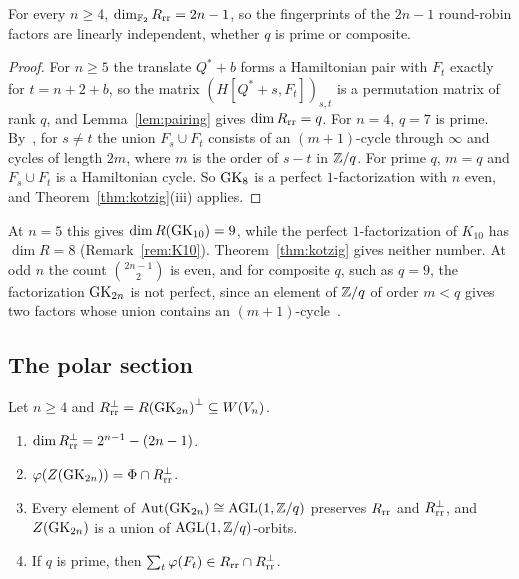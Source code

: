 \begin{theorem}\label{thm:rr}
For every $n\ge4$, $\dim_{\mathbb{F}_2}R_{\mathrm{rr}}=2n-1$, so the fingerprints of the $2n-1$ round-robin factors are linearly independent, whether $q$ is prime or composite.
\end{theorem}

\begin{proof}
For $n\ge5$ the translate $Q^*+b$ forms a Hamiltonian pair with $F_t$ exactly for $t=n+2+b$, so the matrix ${(H[Q^*+s,F_t])}_{s,t}$ is a permutation matrix of rank $q$, and Lemma~\ref{lem:pairing} gives $\dim R_{\mathrm{rr}}=q$. For $n=4$, $q=7$ is prime. By~\cite[Thm.~2.1]{Cameron75}, for $s\ne t$ the union $F_s\cup F_t$ consists of an $(m+1)$-cycle through $\infty$ and cycles of length $2m$, where $m$ is the order of $s-t$ in $\mathbb{Z}/q$. For prime $q$, $m=q$ and $F_s\cup F_t$ is a Hamiltonian cycle. So $\mathrm{GK}_8$ is a perfect $1$-factorization with $n$ even, and Theorem~\ref{thm:kotzig}(iii) applies.
\end{proof}

At $n=5$ this gives $\dim R(\mathrm{GK}_{10})=9$, while the perfect $1$-factorization of $K_{10}$ has $\dim R=8$ (Remark~\ref{rem:K10}). Theorem~\ref{thm:kotzig} gives neither number. At odd $n$ the count $\binom{2n-1}{2}$ is even, and for composite $q$, such as $q=9$, the factorization $\mathrm{GK}_{2n}$ is not perfect, since an element of $\mathbb{Z}/q$ of order $m<q$ gives two factors whose union contains an $(m+1)$-cycle~\cite[Thm.~2.1]{Cameron75}.

\subsection{The polar section}\label{subsec:slice}

\begin{theorem}\label{thm:slice}
Let $n\ge4$ and $R_{\mathrm{rr}}^\perp={R(\mathrm{GK}_{2n})}^\perp\subseteq W(V_n)$.
\begin{enumerate}
\item $\dim R_{\mathrm{rr}}^\perp=2^{n-1}-(2n-1)$.
\item $\varphi(Z(\mathrm{GK}_{2n}))=\Phi\cap R_{\mathrm{rr}}^\perp$.
\item Every element of $\operatorname{Aut}(\mathrm{GK}_{2n})\cong\operatorname{AGL}(1,\mathbb{Z}/q)$ preserves $R_{\mathrm{rr}}$ and $R_{\mathrm{rr}}^\perp$, and $Z(\mathrm{GK}_{2n})$ is a union of $\operatorname{AGL}(1,\mathbb{Z}/q)$-orbits.
\item If $q$ is prime, then $\sum_t\varphi(F_t)\in R_{\mathrm{rr}}\cap R_{\mathrm{rr}}^\perp$.
\end{enumerate}
\end{theorem}

